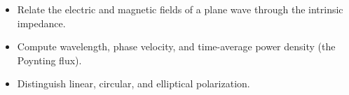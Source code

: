 \begin{objectives}
\begin{itemize}[leftmargin=1.4em,itemsep=2pt]
\item Relate the electric and magnetic fields of a plane wave through the intrinsic impedance.
\item Compute wavelength, phase velocity, and time-average power density (the Poynting flux).
\item Distinguish linear, circular, and elliptical polarization.
\end{itemize}
\end{objectives}
